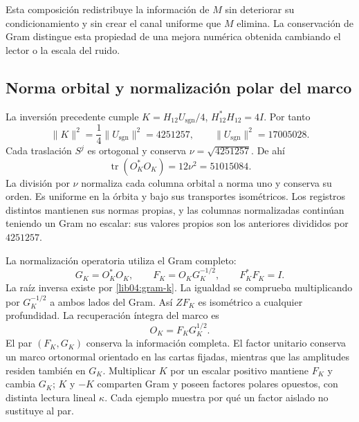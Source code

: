 Esta composición redistribuye la información de \(M\) sin deteriorar
su condicionamiento y sin crear el canal uniforme que \(M\) elimina.
La conservación de Gram distingue esta propiedad de una mejora
numérica obtenida cambiando el lector o la escala del ruido.

\subsection{Norma orbital y normalización polar del marco}
\label{lib04:normalizacion}

La inversión precedente cumple
\(K=H_{12}U_{\mathrm{sgn}}/4\),
\(H_{12}^*H_{12}=4I\). Por tanto
\begin{equation}
 \|K\|^2=\frac14\|U_{\mathrm{sgn}}\|^2=4251257,
 \qquad \|U_{\mathrm{sgn}}\|^2=17005028.
 \label{lib04:norma-k}
\end{equation}
Cada traslación \(S^j\) es ortogonal y conserva
\(\nu=\sqrt{4251257}\). De ahí
\begin{equation}
 \operatorname{tr}(O_K^*O_K)=12\nu^2=51015084.
 \label{lib04:traza-marco}
\end{equation}
La división por \(\nu\) normaliza cada columna orbital a norma
uno y conserva su orden. Es uniforme en la órbita y bajo sus
transportes isométricos. Los registros distintos mantienen sus normas
propias, y las columnas normalizadas continúan teniendo un Gram
no escalar: sus valores propios son los anteriores divididos por
\(4251257\).

La normalización operatoria utiliza el Gram completo:
\begin{equation}
 G_K=O_K^*O_K,\qquad
 F_K=O_KG_K^{-1/2},\qquad
 F_K^*F_K=I.
 \label{lib04:polar}
\end{equation}
La raíz inversa existe por \eqref{lib04:gram-k}. La igualdad se
comprueba multiplicando por \(G_K^{-1/2}\) a ambos lados del Gram.
Así \(ZF_K\) es isométrico a cualquier profundidad.
La recuperación íntegra del marco es
\begin{equation}
 O_K=F_KG_K^{1/2}.
 \label{lib04:polar-inversa}
\end{equation}
El par \((F_K,G_K)\) conserva la información completa.
El factor unitario conserva un marco ortonormal orientado en las
cartas fijadas, mientras que las amplitudes residen también en
\(G_K\). Multiplicar \(K\) por un escalar positivo mantiene
\(F_K\) y cambia \(G_K\); \(K\) y \(-K\) comparten
Gram y poseen factores polares opuestos, con distinta lectura lineal
\(\kappa\). Cada ejemplo muestra por qué un factor aislado no
sustituye al par.


